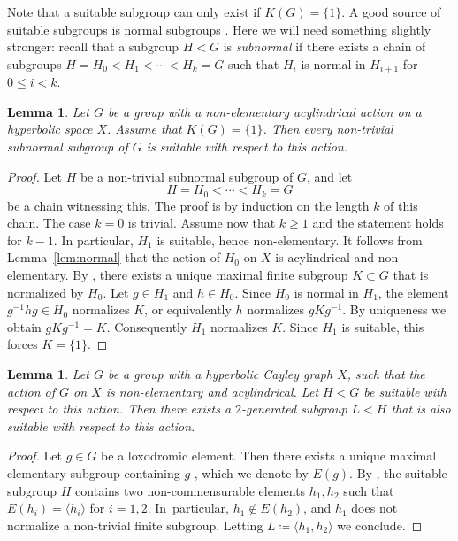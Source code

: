 \documentclass[JEP,XML,SOM,Unicode]{cedram}
\newtheorem{lemma}[theorem]{Lemma}
\theoremstyle{definition}
\begin{document}
Note that a suitable subgroup can only exist if $K(G) = \{ 1 \}$.
A good source of suitable subgroups is normal subgroups \cite[Lem.\,3.23]{CIOS}. Here we will need something slightly stronger: recall that a subgroup $H < G$ is \emph{subnormal} if there exists a chain of subgroups $H = H_0 < H_1 < \cdots < H_k = G$ such that $H_i$ is normal in $H_{i+1}$ for $0 \leq i < k$.

\begin{lemma}
\label{lem:normal:suitable}
Let $G$ be a group with a non-elementary acylindrical action on a hyperbolic space $X$.
Assume that $K(G) = \{1\}$.
Then every non-trivial subnormal subgroup of $G$ is suitable with respect to this action.
\end{lemma}

\begin{proof}
Let $H$ be a non-trivial subnormal subgroup of $G$, and let
\[
H = H_0 < \cdots < H_k = G
\]
be a chain witnessing this.
The proof is by induction on the length $k$ of this chain.
The case $k = 0$ is trivial.
Assume now that $k \geq 1$ and the statement holds for $k-1$.
In particular, $H_1$ is suitable, hence non-elementary.
It follows from Lemma~\ref{lem:normal} that the action of $H_0$ on $X$ is acylindrical and non-elementary.
By \cite[Lem.\,5.5]{hull}, there exists a unique maximal finite subgroup $K \subset G$ that is normalized by $H_0$. Let $g \in H_1$ and $h \in H_0$.
Since $H_0$ is normal in $H_1$, the element $g^{-1}hg \in H_0$ normalizes $K$, or equivalently $h$ normalizes $gKg^{-1}$.
By uniqueness we obtain $gKg^{-1} = K$.
Consequently $H_1$ normalizes $K$.
Since $H_1$ is suitable, this forces $K = \{1\}$.
\end{proof}

\begin{lemma}
\label{lem:suitable:rank2}
Let $G$ be a group with a hyperbolic Cayley graph $X$, such that the action of $G$ on $X$ is non-elementary and acylindrical.
Let $H < G$ be suitable with respect to this action. Then there exists a $2$-generated subgroup $L < H$ that is also suitable with respect to this action.
\end{lemma}

\begin{proof}
Let $g \in G$ be a loxodromic element. Then there exists a unique maximal elementary subgroup containing $g$ \cite[Lem.\,6.5, Cor.\,6.6]{DGO}, which we denote by $E(g)$. By \cite[Cor.\,5.7]{hull}, the suitable subgroup $H$ contains two non-commensurable elements $h_1, h_2$ such that $E(h_i) = \langle h_i \rangle$ for $i = 1, 2$. In~particular, $h_1 \notin E(h_2)$, and $h_1$ does not normalize a non-trivial finite subgroup. Letting $L \coloneqq \langle h_1, h_2 \rangle$ we conclude.
\end{proof}
\end{document}
